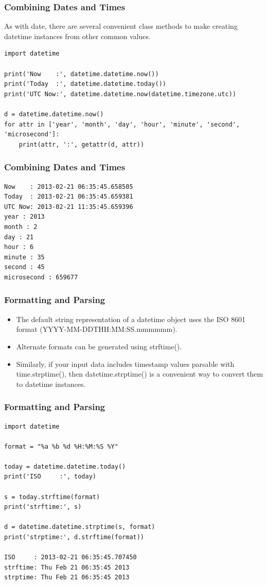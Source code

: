 \begin{frame}[fragile]\frametitle{Combining Dates and Times}
As with date, there are several convenient class methods to make creating datetime instances from other common values.
\begin{lstlisting}
import datetime

print('Now    :', datetime.datetime.now())
print('Today  :', datetime.datetime.today())
print('UTC Now:', datetime.datetime.now(datetime.timezone.utc))

d = datetime.datetime.now()
for attr in ['year', 'month', 'day', 'hour', 'minute', 'second', 'microsecond']:
    print(attr, ':', getattr(d, attr))
\end{lstlisting}
\end{frame}


\begin{frame}[fragile]\frametitle{Combining Dates and Times}
\begin{lstlisting}
Now    : 2013-02-21 06:35:45.658505
Today  : 2013-02-21 06:35:45.659381
UTC Now: 2013-02-21 11:35:45.659396
year : 2013
month : 2
day : 21
hour : 6
minute : 35
second : 45
microsecond : 659677
\end{lstlisting}
\end{frame}


\begin{frame}[fragile]\frametitle{Formatting and Parsing}
\begin{itemize}
\item The default string representation of a datetime object uses the ISO 8601 format (YYYY-MM-DDTHH:MM:SS.mmmmmm). 
\item Alternate formats can be generated using strftime(). 
\item Similarly, if your input data includes timestamp values parsable with time.strptime(), then datetime.strptime() is a convenient way to convert them to datetime instances.

\end{itemize}
\end{frame}

\begin{frame}[fragile]\frametitle{Formatting and Parsing}
\begin{lstlisting}
import datetime

format = "%a %b %d %H:%M:%S %Y"

today = datetime.datetime.today()
print('ISO     :', today)

s = today.strftime(format)
print('strftime:', s)

d = datetime.datetime.strptime(s, format)
print('strptime:', d.strftime(format))

ISO     : 2013-02-21 06:35:45.707450
strftime: Thu Feb 21 06:35:45 2013
strptime: Thu Feb 21 06:35:45 2013
\end{lstlisting}
\end{frame}

